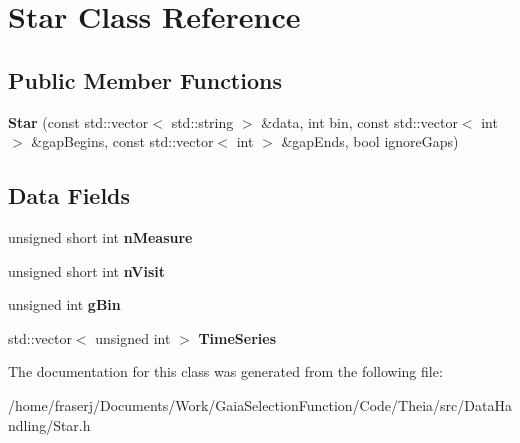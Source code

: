 \hypertarget{classStar}{}\section{Star Class Reference}
\label{classStar}
\subsection*{Public Member Functions}
\begin{DoxyCompactItemize}
\item 
\mbox{\label{classStar_aace160d83fb4be45f11ca9db7dc7d51c}} 
{\bfseries Star} (const std\+::vector$<$ std\+::string $>$ \&data, int bin, const std\+::vector$<$ int $>$ \&gap\+Begins, const std\+::vector$<$ int $>$ \&gap\+Ends, bool ignore\+Gaps)
\end{DoxyCompactItemize}
\subsection*{Data Fields}
\begin{DoxyCompactItemize}
\item 
\mbox{\label{classStar_abbd3c299046233f3e5f2cf100981e05e}} 
unsigned short int {\bfseries n\+Measure}
\item 
\mbox{\label{classStar_ac00a219fe6c887b16cb72e263c676ea9}} 
unsigned short int {\bfseries n\+Visit}
\item 
\mbox{\label{classStar_a5d29a213dddb43a01b5058486ce6e323}} 
unsigned int {\bfseries g\+Bin}
\item 
\mbox{\label{classStar_aaf5c50e6d1c9905c76a0bc2922de97d0}} 
std\+::vector$<$ unsigned int $>$ {\bfseries Time\+Series}
\end{DoxyCompactItemize}


The documentation for this class was generated from the following file\+:\begin{DoxyCompactItemize}
\item 
/home/fraserj/\+Documents/\+Work/\+Gaia\+Selection\+Function/\+Code/\+Theia/src/\+Data\+Handling/Star.\+h\end{DoxyCompactItemize}
